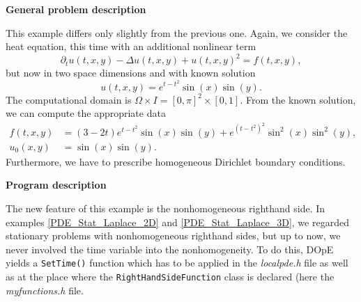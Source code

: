 \textbf{General problem description}

\vspace{0.2cm}

This example differs only slightly from the previous one. Again, we consider the heat equation, this time with an additional nonlinear term
\begin{equation*}
\partial_t u(t,x,y) - \Delta u(t,x,y) + u(t,x,y)^2 = f(t,x,y),
\end{equation*}
but now in two space dimensions and with known solution 
\begin{equation*}
u(t,x,y) = e^{t-t^2} \sin(x) \sin(y).
\end{equation*}
The computational domain is $\Omega \times I = [0,\pi]^2 \times [0,1]$. From the known solution, we can compute the appropriate data 
\begin{align*}
f(t,x,y) &= (3-2t)e^{t-t^2} \sin(x) \sin(y) + e^{(t-t^2)^2} \sin^2(x) \sin^2(y),\\
u_0(x,y) &= \sin(x) \sin(y).
\end{align*}
Furthermore, we have to prescribe homogeneous Dirichlet boundary conditions.

\vspace{0.2cm}

\textbf{Program description}

\vspace{0.2cm}

The new feature of this example is the nonhomogeneous righthand side. In examples \ref{PDE_Stat_Laplace_2D} and \ref{PDE_Stat_Laplace_3D}, we regarded stationary problems with nonhomogeneous righthand sides, but up to now, we never involved the time variable into the nonhomogeneity. To do this, DOpE yields a \texttt{SetTime()} function which has to be applied in the \textit{localpde.h} file as well as at the place where the \texttt{RightHandSideFunction} class is declared (here the \textit{myfunctions.h} file.
